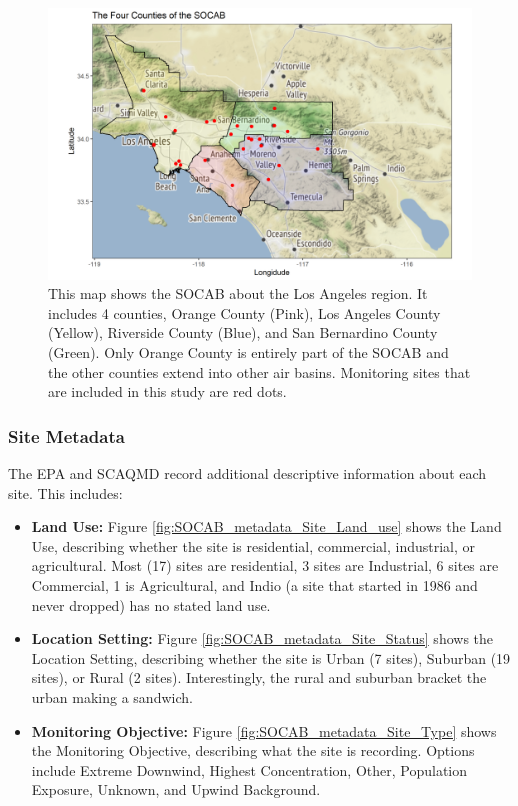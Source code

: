 \documentclass{article}
\begin{document}
\begin{figure}[ht]
	\centering
	\includegraphics[width = \textwidth]{Figures/SOCAB_counties.png}
	\caption{This map shows the \ac{SOCAB} about the Los Angeles region.  It includes 4 counties, Orange County (Pink), Los Angeles County (Yellow), Riverside County (Blue), and San Bernardino County (Green).  Only Orange County is entirely part of the \ac{SOCAB} and the other counties extend into other air basins.  Monitoring sites that are included in this study are red dots.}
	\label{fig:SOCAB_counties}
\end{figure}

\subsubsection*{Site Metadata}
\label{subsubsec:sitemetadata}
The \ac{EPA} and \ac{SCAQMD} record additional descriptive information about each site.  This includes:  

\begin{itemize}
	\item \textbf{Land Use:} Figure  \ref{fig:SOCAB_metadata_Site_Land_use} shows the Land Use, describing whether the site is residential, commercial, industrial, or agricultural.  Most (17) sites are residential, 3 sites are Industrial, 6 sites are Commercial, 1 is Agricultural, and Indio (a site that started in 1986 and never dropped) has no stated land use.
	
	\item \textbf{Location Setting:} Figure  \ref{fig:SOCAB_metadata_Site_Status} shows the Location Setting, describing whether the site is Urban (7 sites), Suburban (19 sites), or Rural (2 sites).  Interestingly, the rural and suburban bracket the urban making a sandwich.  
	
	\item \textbf{Monitoring Objective:} Figure  \ref{fig:SOCAB_metadata_Site_Type} shows the Monitoring Objective, describing what the site is recording.  Options include Extreme Downwind, Highest Concentration, Other, Population Exposure, Unknown, and Upwind Background.   
\end{itemize}
\end{document}
